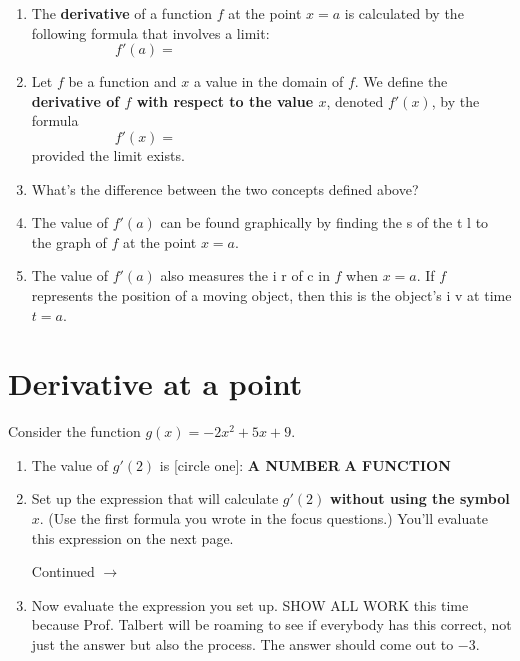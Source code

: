 \documentclass[11pt]{article}
\def\ra{\rightarrow}
\def\pageturn{\vfill 
\begin{flushright}
	\begin{small}
		Continued $\ra$
	\end{small}
\end{flushright} \newpage}
\begin{document}
\begin{enumerate}
	
	\item The \textbf{derivative} of a function $f$ at the point $x=a$ is calculated by the following formula that involves a limit: 
	\[ f'(a) = \hspace{3in} \]
	
	\item Let $f$ be a function and $x$ a value in the domain of $f$. We define the \textbf{derivative of $f$ with respect to the value $x$}, denoted $f'(x)$, by the formula 
	\[ f'(x)= \hspace{3in}   \] 
provided the limit exists. 

	\item What's the difference between the two concepts defined above? 
	
	\item The value of $f'(a)$ can be found graphically by finding  the s\underline{\hspace{1in}} of the t\underline{\hspace{1in}} l\underline{\hspace{1in}} to the graph of $f$ at the point $x = a$. 
	
	\item The value of $f'(a)$ also measures the i\underline{\hspace{1in}} r\underline{\hspace{1in}} of c\underline{\hspace{1in}} in $f$ when $x=a$. If $f$ represents the position of a moving object, then this is the object's i\underline{\hspace{1in}} v\underline{\hspace{1in}} at time $t=a$.
		
\end{enumerate}

\section{Derivative at a point}

Consider the function $g(x) = -2x^2 + 5x + 9$. 

\begin{enumerate}
	\item The value of $g'(2)$ is [circle one]: \textbf{A NUMBER} \quad \textbf{A FUNCTION} 
	\item Set up the expression that will calculate $g'(2)$ \textbf{without using the symbol} $x$. (Use the first formula you wrote in the focus questions.) You'll evaluate this expression on the next page.
	
	\pageturn
	
	
	\item Now evaluate the expression you set up. SHOW ALL WORK this time because Prof. Talbert will be roaming to see if everybody has this correct, not just the answer but also the process. The answer should come out to $-3$.  
\end{enumerate}
\end{document}
